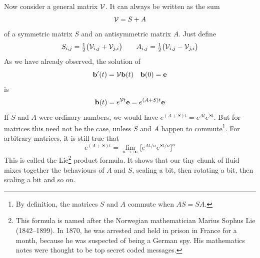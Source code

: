 \noindent
  Now consider a general matrix $\mathcal{V}$. It can always be written 
as the sum
\begin{equation*}
\mathcal{V}=S+A
\end{equation*}
of a symmetric matrix $S$ and an antisymmetric matrix $A$. Just define
\begin{equation*}
S_{i,j}=\tfrac{1}{2}\big(\mathcal{V}_{i,j}+\mathcal{V}_{j,i}\big)\qquad
A_{i,j}=\tfrac{1}{2}\big(\mathcal{V}_{i,j}-\mathcal{V}_{j,i}\big)
\end{equation*}
As we have already observed, the solution of
\begin{equation*}
\mathbf{b}'(t)=\mathcal{V}\mathbf{b}(t)\quad \mathbf{b}(0)=\mathbf{e}
\end{equation*}
is
\begin{equation*}
\mathbf{b}(t)=e^{\mathcal{V} t}\mathbf{e}=e^{(A+S) t}\mathbf{e}
\end{equation*}
If $S$ and $A$ were ordinary numbers, we would have $e^{(A+S) t}=e^{At}e^{St}$.
But for matrices this need not be the case, unless $S$ and $A$ happen
to commute\footnote{By definition, the matrices $S$ and $A$ commute when $AS=SA$.}. For arbitrary matrices, it is still true that
\begin{equation*}
e^{(A+S) t}=\lim_{n\rightarrow\infty }\Big[e^{At/n}e^{St/n}\Big]^n
\end{equation*}
This is called the Lie\footnote{This formula is named after the Norwegian
mathematician Marius Sophus Lie (1842--1899). In 1870, he was arrested and held in prison in France for a month, because he was suspected of being a German spy. His mathematics notes were thought to be top secret coded messages.} 
product formula.
It shows that our tiny chunk of fluid mixes together the behaviours of $A$
and $S$, scaling a bit, then rotating a bit, then scaling a bit and so
on.

